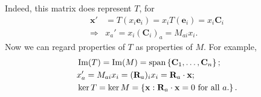 \documentclass[10pt]{article}
\DeclareMathOperator{\im}{Im}
\begin{document}
    Indeed, this matrix does represent $T$, for 
    \[
        \begin{aligned}
            \mathbf{x}'&=T(x_i \mathbf{e}_i)=x_iT(\mathbf{e}_i)=x_i \mathbf{C}_i \\
            \Longrightarrow & x_a'=x_i (\mathbf{C}_i)_a=M_{ai}x_i.
        \end{aligned}
    \]
    Now we can regard properties of $T$ as properties of $M$. For example, 
    \[
        \begin{aligned}
             & \im(T)=\im(M)=\spn\left\{ \mathbf{C}_1,\dots, \mathbf{C}_n\right\};\\
             & x_a'=M_{ai}x_i=(\mathbf{R}_{a})_ix_i= \mathbf{R}_a\cdot \mathbf{x};\\
             & \ker T = \ker M=\left\{ \mathbf{x}:\mathbf{R}_a\cdot \mathbf{x}=0 \text{ for all }a.\right\}.\\
        \end{aligned}
    \]
\end{document}

